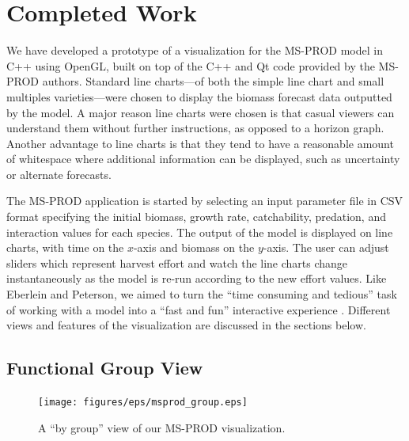 \chapter{Completed Work}

We have developed a prototype of a visualization for the MS-PROD model in C++ using OpenGL, built on top of the C++ and Qt code provided by the MS-PROD authors.  Standard line charts---of both the simple line chart and small multiples varieties---were chosen to display the biomass forecast data outputted by the model.  A major reason line charts were chosen is that casual viewers can understand them without further instructions, as opposed to a horizon graph.  Another advantage to line charts is that they tend to have a reasonable amount of whitespace where additional information can be displayed, such as uncertainty or alternate forecasts.

The MS-PROD application is started by selecting an input parameter file in CSV format specifying the initial biomass, growth rate, catchability, predation, and interaction values for each species.  The output of the model is displayed on line charts, with time on the $x$-axis and biomass on the $y$-axis.  The user can adjust sliders which represent harvest effort and watch the line charts change instantaneously as the model is re-run according to the new effort values.  Like Eberlein and Peterson, we aimed to turn the ``time consuming and tedious'' task of working with a model into a ``fast and fun'' interactive experience \cite{eberlein1992}.  Different views and features of the visualization are discussed in the sections below.  

\section{Functional Group View}

\begin{figure}[h]
	\centering
	\texttt{[image: figures/eps/msprod\_group.eps]}
	\caption{A ``by group'' view of our MS-PROD visualization.}
	\label{fig:msprod_group}
\end{figure}

